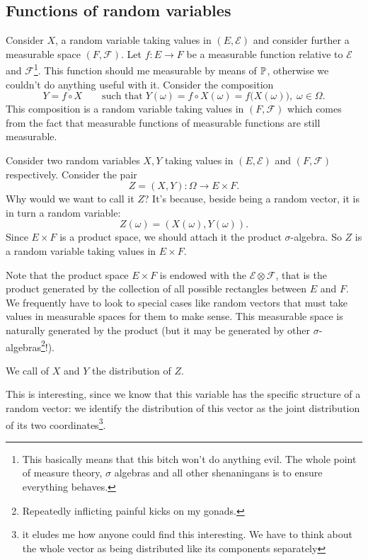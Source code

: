 \documentclass{report}
\begin{document}
\subsection{Functions of random variables}
Consider $X$, a random variable taking values in $(E,\mathscr{E})$ and consider further a measurable space $(F,\mathscr{F})$. Let $f:E\rightarrow F$ be a measurable function relative to $\mathscr{E}$ and $\mathscr{F}$\footnote{This basically means that this bitch won't do anything evil. The whole point of measure theory, $\sigma$ algebras and all other shenaningans is to ensure everything behaves.}. This function should me measurable by means of $\mathbb{P}$, otherwise we couldn't do anything useful with it. Consider the composition
\[Y=f\circ X\qquad\text{such that}\;Y(\omega)=f\circ X(\omega)=f\big(X(\omega)\big),\;\omega\in\Omega.\]
This composition is a random variable taking values in $(F,\mathscr{F})$ which comes from the fact that measurable functions of measurable functions are still measurable. 
\begin{definition}
	Consider two random variables $X,Y$ taking values in $(E,\mathscr{E})$ and $(F,\mathscr{F})$ respectively. Consider the pair
	\[Z=(X,Y):\Omega\rightarrow E\times F.\]
	Why would we want to call it $Z$? It's because, beside being a random vector, it is in turn a random variable:
	\[Z(\omega)=(X(\omega),Y(\omega)).\]
	Since $E\times F$ is a product space, we should attach it the product $\sigma$-algebra. So $Z$ is a random variable taking values in $E\times F$. 
\end{definition}
Note that the product space $E\times F$ is endowed with the \sa $\mathscr{E}\otimes\mathscr{F}$, that is the product \sa generated by the collection of all possible rectangles between $E$ and $F$. We frequently have to look to special cases like random vectors that must take values in measurable spaces for them to make sense. This measurable space is naturally generated by the product \sa (but it may be generated by other $\sigma$-algebras\footnote{Repeatedly inflicting painful kicks on my gonads.}!).
\begin{definition}
	We call  of $X$ and $Y$ the distribution of $Z$. 
\end{definition}
This is interesting, since we know that this variable has the specific structure of a random vector: we identify the distribution of this vector as the joint distribution of its two coordinates\footnote{it eludes me how anyone could find this interesting. We have to think about the whole vector as being distributed like its components separately}. 
\end{document}
